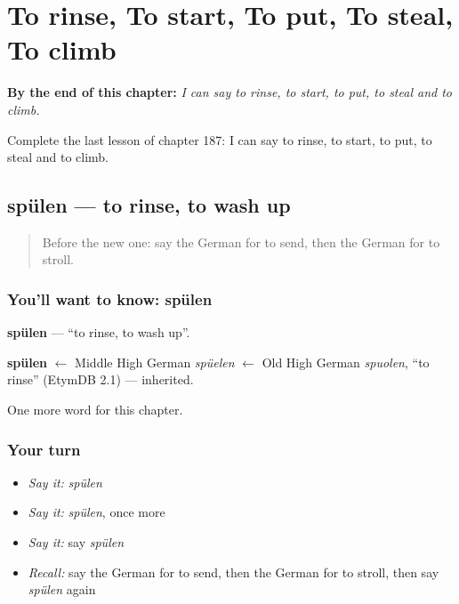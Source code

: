 
\chapter{To rinse, To start, To put, To steal, To climb}
\label{ch:ge-to-rinse-to-start-to-put-to-steal-to-climb}

\begin{chapteropening}
\textbf{By the end of this chapter:} \emph{I can say to rinse, to start, to put, to steal and to climb.}

Complete the last lesson of chapter 187: I can say to rinse, to start, to put, to steal and to climb.
\end{chapteropening}

\section[spülen]{spülen — to rinse, to wash up}

\label{lesson:GE-C187-spuelen}



\begin{quote}
Before the new one: say the German for to send, then the German for to stroll.
\end{quote}

\subsection*{You'll want to know: spülen}
\textbf{spülen} — \textquotedblleft{}to rinse, to wash up\textquotedblright{}.

\begin{cousinweb}
\textbf{spülen} $\leftarrow$ Middle High German \emph{spüelen} $\leftarrow$ Old High German \emph{spuolen}, \textquotedblleft{}to rinse\textquotedblright{} (EtymDB 2.1) — inherited.
\end{cousinweb}

\begin{grammarlens}[title={What you've built}]
One more word for this chapter.
\end{grammarlens}

\subsection*{Your turn}
\begin{itemize}
\raggedright
  \item \emph{Say it:} \emph{spülen}
  \item \emph{Say it:} \emph{spülen}, once more
  \item \emph{Say it:} say \emph{spülen}
  \item \emph{Recall:} say the German for to send, then the German for to stroll, then say \emph{spülen} again
\end{itemize}

